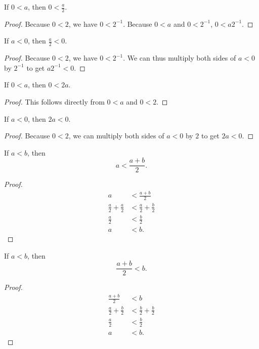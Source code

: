 \documentclass[../../math.tex]{subfiles}
\begin{document}
\begin{theorem}
    If $0 < a$, then $0 < \frac{a}{2}$.
\end{theorem}
\begin{proof}
    Because $0 < 2$, we have $0 < 2^{-1}$.  Because $0 < a$ and $0 < 2^{-1}$, $0
    < a2^{-1}$.
\end{proof}

\begin{theorem}
    If $a < 0$, then $\frac{a}{2} < 0$.
\end{theorem}
\begin{proof}
    Because $0 < 2$, we have $0 < 2^{-1}$.  We can thus multiply both sides of
    $a < 0$ by $2^{-1}$ to get $a2^{-1} < 0$.
\end{proof}

\begin{theorem}
    If $0 < a$, then $0 < 2a$.
\end{theorem}
\begin{proof}
    This follows directly from $0 < a$ and $0 < 2$.
\end{proof}

\begin{theorem}
    If $a < 0$, then $2a < 0$.
\end{theorem}
\begin{proof}
    Because $0 < 2$, we can multiply both sides of $a < 0$ by $2$ to get $2a <
    0$.
\end{proof}

\begin{theorem}
    If $a < b$, then
    \[
        a < \frac{a + b}{2}.
    \]
\end{theorem}
\begin{proof}
    \begin{align*}
        a &< \frac{a + b}{2} \\
        \frac{a}{2} + \frac{a}{2} &< \frac{a}{2} + \frac{b}{2} \\
        \frac{a}{2} &< \frac{b}{2} \\
        a &< b.
    \end{align*}
\end{proof}

\begin{theorem}
    If $a < b$, then
    \[
        \frac{a + b}{2} < b.
    \]
\end{theorem}
\begin{proof}
    \begin{align*}
        \frac{a + b}{2} &< b \\
        \frac{a}{2} + \frac{b}{2} &< \frac{b}{2} + \frac{b}{2} \\
        \frac{a}{2} &< \frac{b}{2} \\
        a &< b.
    \end{align*}
\end{proof}
\end{document}
